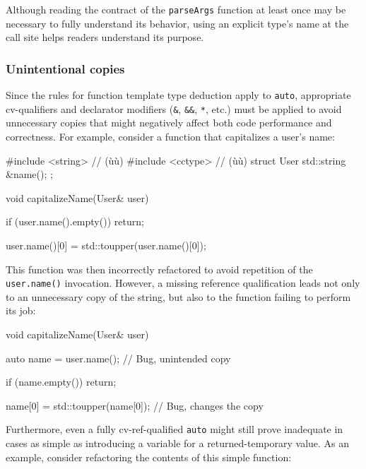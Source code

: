 \noindent Although reading the contract of the \lstinline!parseArgs!
function at least once may be necessary to fully understand its behavior, using an
explicit type's name at the call site helps readers understand its
purpose.

\subsubsection[Unintentional copies]{Unintentional copies}\label{unintentional-copies}

Since the rules for function template type deduction apply to
\lstinline!auto!, appropriate cv-qualifiers and declarator modifiers
(\lstinline!&!, \lstinline!&&!, \lstinline!*!, etc.) must be applied to avoid
unnecessary copies that might negatively affect both code performance
and correctness. For example, consider a function that capitalizes a
user's name:

\begin{emcppshiddenlisting}[emcppsbatch={e13,e14}]
#include <string>  // (ù{}ù)
#include <cctype>  // (ù{}ù)
struct User {
   std::string &name();
};
\end{emcppshiddenlisting}
\begin{emcppslisting}[emcppsbatch=e13]
void capitalizeName(User& user)
{
    if (user.name().empty())
    {
        return;
    }

    user.name()[0] = std::toupper(user.name()[0]);
}
\end{emcppslisting}
    
\noindent This function was then incorrectly refactored to avoid repetition of
the \lstinline!user.name()! invocation. However, a missing reference
qualification leads not only to an unnecessary copy of the string, but
also to the function failing to perform its job:

\begin{emcppslisting}[emcppsbatch=e14]
void capitalizeName(User& user)
{
    auto name = user.name();  // Bug, unintended copy

    if (name.empty())
    {
         return;
    }

    name[0] = std::toupper(name[0]);  // Bug, changes the copy
}
\end{emcppslisting}
    
\noindent Furthermore, even a fully cv-ref-qualified \lstinline!auto! might still
prove inadequate in cases as simple as introducing a variable for a
returned-temporary value. As an example, consider refactoring the
contents of this simple function:


